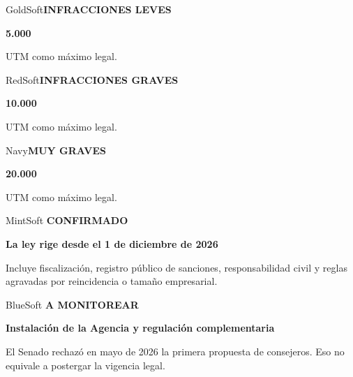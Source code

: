 \documentclass[11pt,a4paper]{article}
\newcommand{\eyebrow}[1]{\fontsize{8.5}{10}\selectfont\bfseries\color{Red}\MakeUppercase{#1}}
\newcommand{\cardtitle}[1]{\fontsize{10}{12}\selectfont\bfseries\color{Charcoal}#1}
\newcommand{\smallcopy}[1]{\fontsize{9.8}{13}\selectfont\color{Charcoal}#1}
\newcommand{\metric}[1]{\fontsize{24}{25}\selectfont\bfseries\color{Red}#1}
\newcommand{\twocol}[2]{%
  \begin{minipage}[t]{0.485\textwidth}#1\end{minipage}\hfill
  \begin{minipage}[t]{0.485\textwidth}#2\end{minipage}
}
\newcommand{\threecol}[3]{%
  \begin{minipage}[t]{0.316\textwidth}#1\end{minipage}\hfill
  \begin{minipage}[t]{0.316\textwidth}#2\end{minipage}\hfill
  \begin{minipage}[t]{0.316\textwidth}#3\end{minipage}
}
\begin{document}
\threecol{
  \begin{softcard}{GoldSoft}\eyebrow{Infracciones leves}\par\vspace{2mm}\metric{5.000}\par\smallcopy{UTM como máximo legal.}\end{softcard}
}{
  \begin{softcard}{RedSoft}\eyebrow{Infracciones graves}\par\vspace{2mm}\metric{10.000}\par\smallcopy{UTM como máximo legal.}\end{softcard}
}{
  \begin{softcard}{Navy}\color{White}\eyebrow{Muy graves}\color{White}\par\vspace{2mm}\fontsize{24}{25}\selectfont\bfseries 20.000\par\fontsize{9.8}{13}\selectfont UTM como máximo legal.\end{softcard}
}

\vspace{5mm}
\twocol{
  \begin{softcard}{MintSoft}
    \eyebrow{Confirmado}\par\vspace{2mm}
    \cardtitle{La ley rige desde el 1 de diciembre de 2026}\par\vspace{2mm}
    \smallcopy{Incluye fiscalización, registro público de sanciones, responsabilidad civil y reglas agravadas por reincidencia o tamaño empresarial.}
  \end{softcard}
}{
  \begin{softcard}{BlueSoft}
    \eyebrow{A monitorear}\par\vspace{2mm}
    \cardtitle{Instalación de la Agencia y regulación complementaria}\par\vspace{2mm}
    \smallcopy{El Senado rechazó en mayo de 2026 la primera propuesta de consejeros. Eso no equivale a postergar la vigencia legal.}
  \end{softcard}
}
\end{document}
